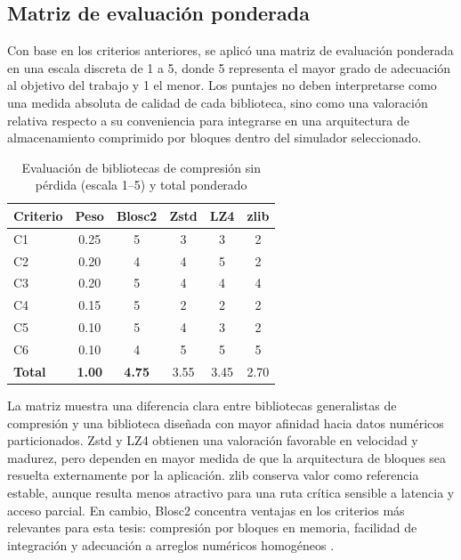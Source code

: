 \subsection{Matriz de evaluación ponderada}

Con base en los criterios anteriores, se aplicó una matriz de evaluación ponderada en una
escala discreta de 1 a 5, donde 5 representa el mayor grado de adecuación al objetivo del
trabajo y 1 el menor. Los puntajes no deben interpretarse como una medida absoluta de
calidad de cada biblioteca, sino como una valoración relativa respecto a su conveniencia
para integrarse en una arquitectura de almacenamiento comprimido por bloques dentro
del simulador seleccionado.

\begin{table}[H]
    \centering
    \caption{Evaluación de bibliotecas de compresión sin pérdida (escala 1--5) y total ponderado}
    \label{tab:evaluacion_bibliotecas}
    \begin{tabular}{lccccc}
        \hline
        \multicolumn{1}{c}{\textbf{Criterio}} &
        \textbf{Peso} &
        \textbf{Blosc2} &
        \textbf{Zstd} &
        \textbf{LZ4} &
        \textbf{zlib} \\
        \hline
        C1 & 0.25 & 5 & 3 & 3 & 2 \\
        C2 & 0.20 & 4 & 4 & 5 & 2 \\
        C3 & 0.20 & 5 & 4 & 4 & 4 \\
        C4 & 0.15 & 5 & 2 & 2 & 2 \\
        C5 & 0.10 & 5 & 4 & 3 & 2 \\
        C6 & 0.10 & 4 & 5 & 5 & 5 \\
        \hline
        \textbf{Total} & \textbf{1.00} &
        \textbf{4.75} & 3.55 & 3.45 & 2.70 \\
        \hline
    \end{tabular}
\end{table}

La matriz muestra una diferencia clara entre bibliotecas generalistas de compresión y
una biblioteca diseñada con mayor afinidad hacia datos numéricos particionados. Zstd y
LZ4 obtienen una valoración favorable en velocidad y madurez, pero dependen en mayor
medida de que la arquitectura de bloques sea resuelta externamente por la aplicación.
zlib conserva valor como referencia estable, aunque resulta menos atractivo para una ruta
crítica sensible a latencia y acceso parcial. En cambio, Blosc2 concentra ventajas en los
criterios más relevantes para esta tesis: compresión por bloques en memoria, facilidad de
integración y adecuación a arreglos numéricos homogéneos \cite{blosc2_docs}.
